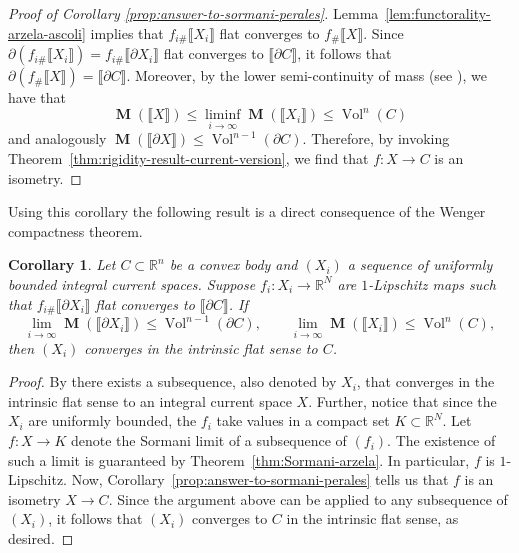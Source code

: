 \documentclass[reqno]{amsart}
\newtheorem{corollary}[theorem]{Corollary}
\numberwithin{equation}{section}
\newcommand{\R}{\mathbb{R}}
\newcommand{\vol}{\operatorname{Vol}}
\newcommand{\bb}[1]{\llbracket #1\rrbracket}
\DeclareMathOperator{\mass}{\mathbf{M}}
\begin{document}
\begin{proof}[Proof of Corollary \ref{prop:answer-to-sormani-perales}]
Lemma~\ref{lem:functorality-arzela-ascoli} implies that \(f_{i\#}\bb{X_i}\) flat converges to \(f_\# \bb{X}\). 
Since \(\partial (f_{i\#}\bb{X_i})=f_{i\#}\bb{\partial X_i}\) flat converges to \(\bb{\partial C}\), it follows that \(\partial (f_\# \bb{X})=\bb{\partial C}\). Moreover, by the lower semi-continuity of mass (see \cite[p. 19]{amb00}), we have that
\[
\mass(\bb{X})\leq \liminf _{i\to \infty} \mass(\bb{X_i}) \leq \vol^n(C)
\]
and analogously \(\mass(\bb{\partial X})\le \vol^{n-1}(\partial C)\).  Therefore, by invoking Theorem~\ref{thm:rigidity-result-current-version}, we find that \(f\colon X\to C\) is an isometry. 
\end{proof}

Using this corollary the following result is a direct consequence of the Wenger compactness theorem.

\begin{corollary}\label{cor:flat-convergence}
Let $C\subset \R^n$ be a convex body and \((X_i)\) a sequence of uniformly bounded integral current spaces. Suppose \(f_i \colon X_i \to \R^N\) are \(1\)-Lipschitz maps such that \(f_{i\#}\bb{\partial X_i}\) flat converges to \(\bb{\partial C}\). If 
\[
\lim_{i\to \infty} \mass(\bb{\partial X_i}) \leq \vol^{n-1}(\partial C), \quad \quad \lim_{i\to \infty} \mass(\bb{X_i}) \leq \vol^n(C),
\]
then \((X_i)\) converges in the intrinsic flat sense to \(C\).  
\end{corollary}

\begin{proof}
By \cite[Theorem 1.2]{wenger-2011} there exists a subsequence, also denoted by \(X_i\), that converges in the intrinsic flat sense to an integral current space \(X\). Further, notice that since the \(X_i\) are uniformly bounded, the \(f_i\) take values in a compact set \(K\subset \R^N\). Let \(f\colon X\to K\) denote the Sormani limit of a subsequence of \((f_i)\). The existence of such a limit is guaranteed by Theorem~\ref{thm:Sormani-arzela}. In particular, \(f\) is \(1\)-Lipschitz. Now, Corollary~\ref{prop:answer-to-sormani-perales} tells us that \(f\) is an isometry \(X \to C\). Since the argument above can be applied to any subsequence of \((X_i)\), it follows that \((X_i)\) converges to \(C\) in the intrinsic flat sense, as desired.  
\end{proof}


\end{document}
